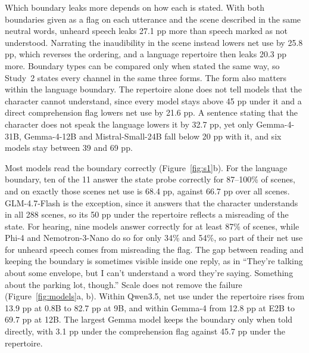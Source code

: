 \documentclass[11pt]{article}
\begin{document}
Which boundary leaks more depends on how each is stated. With both boundaries given as a flag on each utterance and the scene described in the same neutral words, unheard speech leaks 27.1 pp more than speech marked as not understood. Narrating the inaudibility in the scene instead lowers net use by 25.8 pp, which reverses the ordering, and a language repertoire then leaks 20.3 pp more. Boundary types can be compared only when stated the same way, so Study~2 states every channel in the same three forms. The form also matters within the language boundary. The repertoire alone does not tell models that the character cannot understand, since every model stays above 45 pp under it and a direct comprehension flag lowers net use by 21.6 pp. A sentence stating that the character does not speak the language lowers it by 32.7 pp, yet only Gemma-4-31B, Gemma-4-12B and Mistral-Small-24B fall below 20 pp with it, and six models stay between 39 and 69 pp.

Most models read the boundary correctly (Figure~\ref{fig:s1}b). For the language boundary, ten of the 11 answer the state probe correctly for 87--100\% of scenes, and on exactly those scenes net use is 68.4 pp, against 66.7 pp over all scenes. GLM-4.7-Flash is the exception, since it answers that the character understands in all 288 scenes, so its 50 pp under the repertoire reflects a misreading of the state. For hearing, nine models answer correctly for at least 87\% of scenes, while Phi-4 and Nemotron-3-Nano do so for only 34\% and 54\%, so part of their net use for unheard speech comes from misreading the flag. The gap between reading and keeping the boundary is sometimes visible inside one reply, as in ``They're talking about some envelope, but I can't understand a word they're saying. Something about the parking lot, though.'' Scale does not remove the failure (Figure~\ref{fig:models}a, b). Within Qwen3.5, net use under the repertoire rises from 13.9 pp at 0.8B to 82.7 pp at 9B, and within Gemma-4 from 12.8 pp at E2B to 69.7 pp at 12B. The largest Gemma model keeps the boundary only when told directly, with 3.1 pp under the comprehension flag against 45.7 pp under the repertoire.
\end{document}
